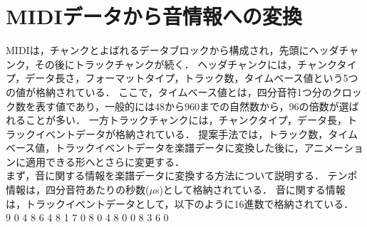 \section{MIDIデータから音情報への変換} \label{sec:analysis}
MIDIは，チャンクとよばれるデータブロックから構成され，先頭にヘッダチャンク，その後にトラックチャンクが続く．
ヘッダチャンクには，チャンクタイプ，データ長さ，フォーマットタイプ，トラック数，タイムベース値という5つの値が格納されている．
ここで，タイムベース値とは，四分音符1つ分のクロック数を表す値であり，一般的には48から960までの自然数から，96の倍数が選ばれることが多い．
一方トラックチャンクには，チャンクタイプ，データ長，トラックイベントデータが格納されている．
提案手法では，トラック数，タイムベース値，トラックイベントデータを楽譜データに変換した後に，アニメーションに適用できる形へとさらに変更する．\\
\indent
まず，音に関する情報を楽譜データに変換する方法について説明する．
テンポ情報は，四分音符あたりの秒数($\mu$s)として格納されている．
音に関する情報は，トラックイベントデータとして，以下のように16進数で格納されている．\\

\hspace{10mm}9 0 4 8 6 4 8 1 7 0 8 0 4 8 0 0 8 3 6 0\\


